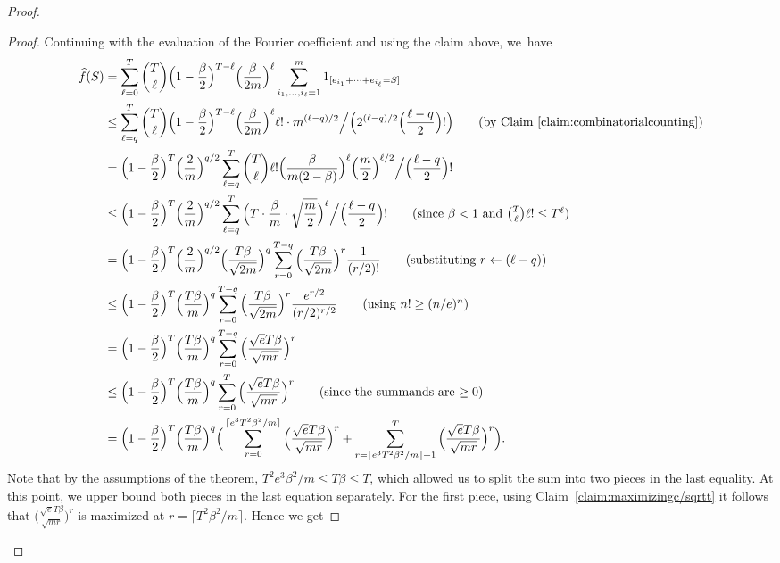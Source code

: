 \documentclass[twoside,11pt]{article}
\begin{document}
\begin{proof}
\begin{proof}
		Continuing with the evaluation of the Fourier coefficient and using the claim above, we~have
		\begin{align*}
		\widehat{f}(S)&=\sum_{\ell=0}^T \binom{T}{\ell} \Big(1-\frac{\beta}{2}\Big)^{T-\ell}\Big(\frac{\beta}{2m}\Big)^{\ell}\sum_{i_1,\ldots, i_\ell=1}^m 1_{[e_{i_1}+\cdots+e_{i_\ell}=S]} \\
		&\leq \sum_{\ell=q}^T \binom{T}{\ell} \Big(1-\frac{\beta}{2}\Big)^{T-\ell}\Big(\frac{\beta}{2m}\Big)^{\ell}\ell! \cdot m^{(\ell-q)/2}\Big/\Big(2^{(\ell-q)/2} \Big(\frac{\ell-q}{2}\Big)!\Big) \tag{by Claim~\ref{claim:combinatorialcounting}}\\
		&= \Big(1-\frac{\beta}{2}\Big)^T \Big( \frac{2}{m} \Big)^{q/2}\sum_{\ell=q}^T \binom{T}{\ell} \ell! \Big(\frac{\beta}{m(2-\beta)}\Big)^\ell \Big( \frac{m}{2} \Big)^{\ell/2} \Big \slash \Big(\frac{\ell-q}{2}\Big)!\\
		& \leq \Big(1-\frac{\beta}{2}\Big)^T \Big( \frac{2}{m} \Big)^{q/2}\sum_{\ell=q}^T \Big(T \cdot \frac{\beta}{m}  \cdot \sqrt{\frac{m}{2}}  \Big)^\ell\Big \slash \Big(\frac{\ell-q}{2}\Big)!\tag{since $\beta< 1$ and $\binom{T}{\ell} \ell!\leq T^\ell$}\\
		&=\Big(1-\frac{\beta}{2}\Big)^T \Big( \frac{2}{m} \Big)^{q/2}\Big( \frac{T\beta}{\sqrt{2m}} \Big)^{q}\sum_{r=0}^{T-q} \Big( \frac{T\beta}{\sqrt{2m}} \Big)^{r} \frac{1}{(r/2)!} \tag{substituting $r\leftarrow (\ell-q)$}\\
		&\leq \Big(1-\frac{\beta}{2}\Big)^T \Big( \frac{T\beta}{m} \Big)^{q}\sum_{r=0}^{T-q} \Big( \frac{T\beta}{\sqrt{2m}} \Big)^{r} \frac{e^{r/2}}{ (r/2)^{r/2}} \tag{using $n!\geq (n/e)^n$}\\
		&=  \Big(1-\frac{\beta}{2}\Big)^T \Big( \frac{T\beta}{m} \Big)^{q}\sum_{r=0}^{T-q} \Big( \frac{\sqrt{e}T\beta}{\sqrt{mr}} \Big)^{r}\\
		&\leq \Big(1-\frac{\beta}{2}\Big)^T \Big( \frac{T\beta}{m} \Big)^{q}\sum_{r=0}^{T} \Big( \frac{\sqrt{e}T\beta}{\sqrt{mr}} \Big)^{r} \tag{since the summands are $\geq 0$} \\
		&= \Big(1-\frac{\beta}{2}\Big)^T \Big( \frac{T\beta}{m} \Big)^{q}\Big(\sum_{r=0}^{\lceil e^3T^2\beta^2/m \rceil} \Big( \frac{\sqrt{e}T\beta}{\sqrt{mr}} \Big)^{r}+\sum_{r=\lceil e^3T^2\beta^2/m \rceil+1}^{T} \Big( \frac{\sqrt{e}T\beta}{\sqrt{mr}} \Big)^{r}\Big).
		\end{align*}
		Note that by the assumptions of the theorem, $T^2e^3\beta^2/m\leq T\beta \leq T$, which allowed us to split the sum into two pieces in the last equality.
		At this point, we upper bound both pieces in the last equation separately. For the first piece, using Claim~\ref{claim:maximizingc/sqrtt} it follows that $\Big( \frac{\sqrt{e}T\beta}{\sqrt{m r}} \Big)^{r}$ is maximized at $r=\lceil T^2\beta^2/m \rceil$. Hence we get

\end{proof}
\end{proof}
\end{document}
